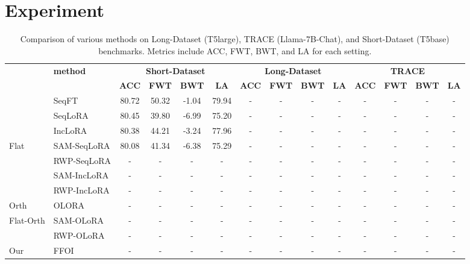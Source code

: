 \documentclass[letterpaper]{article} %
\begin{document}
\section{Experiment}


\begin{table}[thbp]
\centering
\begin{tabular}{llcccccccccccc}
\toprule
 & \multirow{2}{*}{\textbf{method}} 
    & \multicolumn{4}{c}{\textbf{Short-Dataset}} 
    & \multicolumn{4}{c}{\textbf{Long-Dataset }}
    & \multicolumn{4}{c}{\textbf{TRACE}} \\
\cmidrule(lr){3-6} \cmidrule(lr){7-10} \cmidrule(lr){11-14}
 & & \textbf{ACC} & \textbf{FWT} & \textbf{BWT} & \textbf{LA}
   & \textbf{ACC} & \textbf{FWT} & \textbf{BWT} & \textbf{LA}
   & \textbf{ACC} & \textbf{FWT} & \textbf{BWT} & \textbf{LA} \\
\midrule
\multirow{3}{*}{} 
    & SeqFT       & 80.72 & 50.32 & -1.04 & 79.94 & - & - & - & - & - & - & - & - \\
    & SeqLoRA     & 80.45 & 39.80 & -6.99 & 75.20 & - & - & - & - & - & - & - & - \\
    & IncLoRA    & 80.38 & 44.21 & -3.24 & 77.96 & - & - & - & - & - & - & - & - \\
\midrule

\multirow{4}{*}{Flat} 
    & SAM-SeqLoRA & 80.08 & 41.34 & -6.38 & 75.29 & - & - & - & - & - & - & - & - \\ 
    & RWP-SeqLoRA & - & - & - & - & - & - & - & - & - & - & - & - \\
    & SAM-IncLoRA & - & - & - & - & - & - & - & - & - & - & - & - \\ 
    & RWP-IncLoRA & - & - & - & - & - & - & - & - & - & - & - & - \\
\midrule
\multirow{1}{*}{Orth} 
    & OLORA       & - & - & - & - & - & - & - & - & - & - & - & - \\
\midrule
\multirow{2}{*}{Flat-Orth} 
    & SAM-OLoRA & - & - & - & - & - & - & - & - & - & - & - & - \\ 
    & RWP-OLoRA & - & - & - & - & - & - & - & - & - & - & - & - \\
\midrule
\multirow{1}{*}{Our} 
    & FFOI         & - & - & - & - & - & - & - & - & - & - & - & - \\
\bottomrule
\end{tabular}
\caption{Comparison of various methods on Long-Dataset (T5large), TRACE (Llama-7B-Chat), and Short-Dataset (T5base) benchmarks. Metrics include ACC, FWT, BWT, and LA for each setting.}
\label{tab:main_cl_benchmark}
\end{table}
\end{document}
